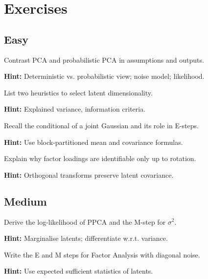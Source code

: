 
\section*{Exercises}

\subsection*{Easy}

\begin{problem}
Contrast PCA and probabilistic PCA in assumptions and outputs.

\textbf{Hint:} Deterministic vs. probabilistic view; noise model; likelihood.
\end{problem}

\begin{problem}
List two heuristics to select latent dimensionality.

\textbf{Hint:} Explained variance, information criteria.
\end{problem}

\begin{problem}
Recall the conditional of a joint Gaussian and its role in E-steps.

\textbf{Hint:} Use block-partitioned mean and covariance formulas.
\end{problem}

\begin{problem}
Explain why factor loadings are identifiable only up to rotation.

\textbf{Hint:} Orthogonal transforms preserve latent covariance.
\end{problem}

\subsection*{Medium}

\begin{problem}
Derive the log-likelihood of PPCA and the M-step for $\sigma^2$.

\textbf{Hint:} Marginalise latents; differentiate w.r.t. variance.
\end{problem}

\begin{problem}[EM for FA]
Write the E and M steps for Factor Analysis with diagonal noise.

\textbf{Hint:} Use expected sufficient statistics of latents.
\end{problem}

